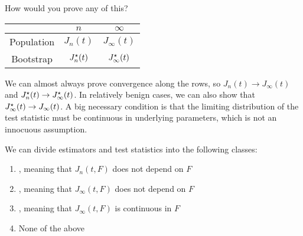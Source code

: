 \documentclass[10pt]{article}
\begin{document}
\begin{question}
	How would you prove any of this?
	\begin{center}
		\begin{tabular}{c|cc}
			& $n$ & $\infty$ \\\hline Population & $J_n(t)$ & $J_\infty(t)$ \\ Bootstrap & $J_n^\star(t)$ & $J_\infty^\star(t)$
		\end{tabular}
	\end{center}
	We can almost always prove convergence along the rows, so $J_n(t)\to J_\infty(t)$ and $J_n^\star(t) \to J_\infty^\star(t)$. In relatively benign cases, we can also show that $J_\infty^\star(t) \to J_\infty(t)$. A big necessary condition is that the limiting distribution of the test statistic must be continuous in underlying parameters, which is not an innocuous assumption. 
\end{question}


\begin{remark}
	We can divide estimators and test statistics into the following classes:\begin{enumerate} \item {}, meaning that $J_n(t,F)$ does not depend on $F$ \item {}, meaning that $J_\infty(t,F)$ does not depend on $F$ \item {}, meaning that $J_\infty(t,F)$ is continuous in $F$ \item None of the above \end{enumerate}
\end{remark}
\end{document}
